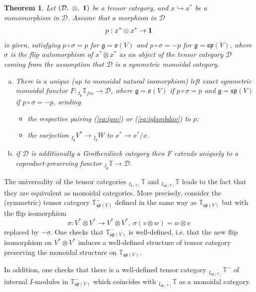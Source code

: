 \documentclass[11pt]{article}
\theoremstyle{plain}
\newtheorem{theorem}[lemma]{Theorem}
\theoremstyle{nonumberplain}
\theoremstyle{plain}
\numberwithin{equation}{section}
\theoremstyle{nonumberplain}
\newcommand\bT{{\mathbb T}}
\newcommand\cD{{\mathcal D}}
\newcommand\fg{{\mathfrak g}}
\newcommand\fo{{\mathfrak o}}
\newcommand\fp{{\mathfrak p}}
\newcommand\fs{{\mathfrak s}}
\newcommand\1{{\bf 1}}
\begin{document}
\begin{theorem}\label{th:osp-univ}
	Let $(\cD,\ \otimes,\ {\bf 1})$ be a tensor category, and $x\hookrightarrow x^*$ be a monomorphism in $\cD$. Assume that a morphism in $\cD$ 
	\begin{equation*}
	p: x^* \otimes x^*\to {\bf 1}
	\end{equation*}
 is given, satisfying $p\circ\sigma=p$ for $\fg=\fo(V)$ and $p\circ\sigma=-p$ for $\fg=\fs\fp(V)$, where $\sigma$ is the flip automorphism of $x^*\otimes x^*$ as an object of the tensor category $\cD$ coming from the assumption that $\cD$ is a symmetric monoidal category.
	\begin{enumerate}[(a)]
		\item There is a unique (up to monoidal natural isomorphism) left exact symmetric monoidal functor $F:{}_{I_{\fg}}\bT_{fin}\to \cD$, where $\fg=\fo(V)$ if $p\circ\sigma=p$ and $\fg=\fs\fp(V)$ if $p\circ\sigma=-p$, sending
		\begin{itemize}
			\item[$-$] the respective pairing (\ref{eq:igsv}) or (\ref{eq:iglambdav}) to $p$;
			\item[$-$] the surjection ${}_{I_{\fg}}V^*\to {}_{I_{\fg}}W$ to $x^*\to x^*/x$.
		\end{itemize}
		\item if $\cD$ is additionally a Grothendieck category then $F$ extends uniquely to a coproduct-preserving functor ${}_{I_{\fg}}\bT\to \cD$.
	\end{enumerate}
\end{theorem}

The universality of the tensor categories ${}_{I_{\fo(V)}}\bT$ and ${}_{I_{\fs\fp(V)}}\bT$ leads to the fact that they are equivalent as monoidal categories. More precisely, consider the (symmetric) tensor category $\bT^-_{\fs\fp(V)}$ defined in the same way as $\bT_{\fs\fp(V)}$ but with the flip isomorphism \begin{equation*}
\sigma: V^*\otimes V^* \rightarrow V^*\otimes V^*,~\sigma(v\otimes w)=w\otimes v
\end{equation*} 
replaced by $-\sigma$. One checks that $\bT^-_{\fs\fp(V)}$ is well-defined, i.e. that the new flip isomorphism on $V^*\otimes V^*$ induces a well-defined structure of tensor category preserving the monoidal structure on $\bT_{\fs\fp(V)}$.

In addition, one checks that there is a well-defined tensor category  ${}_{I_{\fs\fp(V)}}\bT^-$ of internal $I$-modules in $\bT^-_{\fs\fp(V)}$ which coincides with ${}_{I_{\fs\fp(V)}}\bT$ as a monoidal category.
\end{document}
